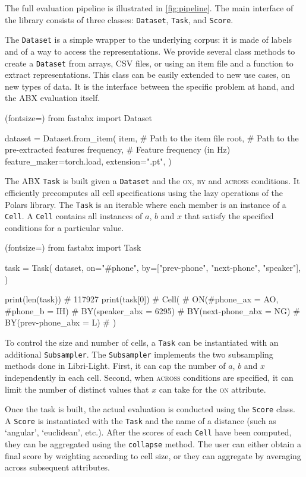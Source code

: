 \documentclass[11pt]{article}
\newcommand{\py}[1]{\texttt{#1}\xspace}
\newcommand{\dataset}{\py{Dataset}}
\newcommand{\cell}{\py{Cell}}
\newcommand{\task}{\py{Task}}
\newcommand{\score}{\py{Score}}
\newcommand{\subsampler}{\py{Subsampler}}
\newcommand{\on}{\textsc{on}\xspace}
\newcommand{\by}{\textsc{by}\xspace}
\newcommand{\across}{\textsc{across}\xspace}
\begin{document}
The full evaluation pipeline is illustrated in \cref{fig:pipeline}. The main interface of the library consists of three classes: \dataset, \task, and \score.

The \dataset is a simple wrapper to the underlying corpus: it is made of labels and of a way to access the representations. We provide several class methods to create a \dataset from arrays, CSV files, or using an item file and a function to extract representations. This class can be easily extended to new use cases, on new types of data. It is the interface between the specific problem at hand, and the ABX evaluation itself.

\begin{python}[Dataset](fontsize=\noexpand\footnotesize)
from fastabx import Dataset

dataset = Dataset.from_item(
  item, # Path to the item file
  root, # Path to the pre-extracted features
  frequency, # Feature frequency (in Hz)
  feature_maker=torch.load,
  extension=".pt",
)       
\end{python}

The ABX \task is built given a \dataset and the \on, \by and \across conditions. It efficiently precomputes all cell specifications using the lazy operations of the Polars library. The \task is an iterable where each member is an instance of a \cell. A \cell contains all instances of $a$, $b$ and $x$ that satisfy the specified conditions for a particular value.

\begin{python}[Task](fontsize=\noexpand\footnotesize)
from fastabx import Task

task = Task(
  dataset,
  on="#phone",
  by=["prev-phone", "next-phone", "speaker"],
)

print(len(task))
# 117927
print(task[0])
# Cell(
#        ON(#phone_ax = AO, #phone_b = IH)
#        BY(speaker_abx = 6295)
#        BY(next-phone_abx = NG)
#        BY(prev-phone_abx = L)
# )
\end{python}

To control the size and number of cells, a \task can be instantiated with an additional \subsampler. The \subsampler implements the two subsampling methods done in Libri-Light. First, it can cap the number of $a$, $b$ and $x$ independently in each cell. Second, when \across conditions are specified, it can limit the number of distinct values that $x$ can take for the \on attribute.

Once the task is built, the actual evaluation is conducted using the \score class. A \score is instantiated with the \task and the name of a distance (such as `angular', `euclidean', etc.). After the scores of each \cell have been computed, they can be aggregated using the \py{collapse} method. The user can either obtain a final score by weighting according to cell size, or they can aggregate by averaging across subsequent attributes.
\end{document}
